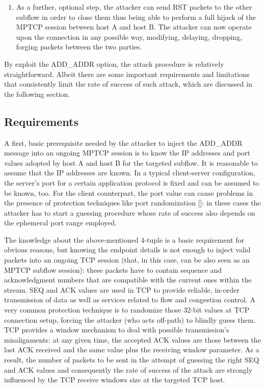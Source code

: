 \begin{enumerate}
\item As a further, optional step, the attacker can send RST packets to the other subflow in order to close them thus being able to perform a full hijack of the MPTCP session between host A and host B. The attacker can now operate upon the connection in any possible way, modifying, delaying, dropping, forging packets between the two parties.
\end{enumerate}

By exploit the ADD\_ADDR option, the attack procedure is relatively straightforward. Albeit there are some important requirements and limitations that consistently limit the rate of success of such attack, which are discussed in the following section.

\subsection{Requirements}
A first, basic prerequisite needed by the attacker to inject the ADD\_ADDR message into an ongoing MPTCP session is to know the IP addresses and port values adopted by host A and host B for the targeted subflow. It is reasonable to assume that the IP addresses are known. In a typical client-server configuration, the server's port for a certain application protocol is fixed and can be assumed to be known, too. For the client counterpart, the port value can cause problems in the presence of protection techniques like port randomization []: in these cases the attacker has to start a guessing procedure whose rate of success also depends on the ephemeral port range employed.

The knowledge about the above-mentioned 4-tuple is a basic requirement for obvious reasons, but knowing the endpoint details is not enough to inject valid packets into an ongoing TCP session (that, in this case, can be also seen as an MPTCP subflow session): these packets have to contain sequence and acknowledgment numbers that are compatible with the current ones within the stream. SEQ and ACK values are used in TCP to provide reliable, in-order transmission of data as well as services related to flow and congestion control. A very common protection technique is to randomize those 32-bit values at TCP connection setup, forcing the attacker (who acts off-path) to blindly guess them. TCP provides a window mechanism to deal with possible transmission's misalignments: at any given time, the accepted ACK values are those between the last ACK received and the same value plus the receiving window parameter. As a result, the number of packets to be sent in the attempt of guessing the right SEQ and ACK values and consequently the rate of success of the attack are strongly influenced by the TCP receive windows size at the targeted TCP host.

